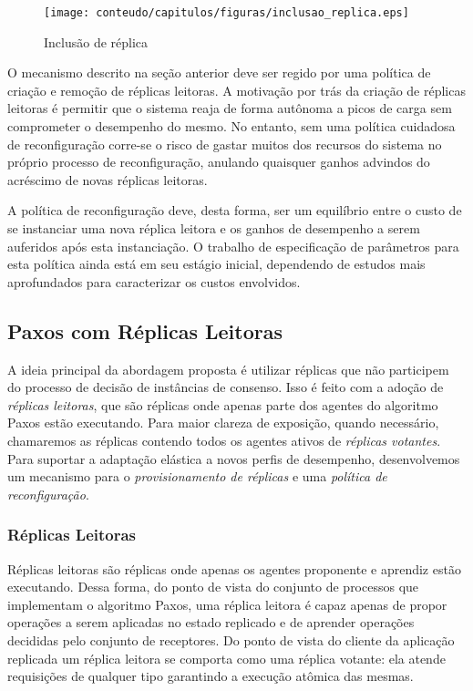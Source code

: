 \begin{figure}[ht]
  \centering
  \texttt{[image: conteudo/capitulos/figuras/inclusao\_replica.eps]}
  \caption{Inclusão de réplica}
  \label{fig:inclusao}
\end{figure}

O mecanismo descrito na seção anterior deve ser regido por uma política de criação e
remoção de réplicas leitoras. A  motivação por trás da criação de réplicas leitoras é
permitir que o sistema reaja de forma autônoma a picos de carga sem comprometer o
desempenho do mesmo. No entanto, sem uma política cuidadosa de reconfiguração corre-se o
risco de gastar muitos dos recursos do sistema no próprio processo de reconfiguração,
anulando quaisquer ganhos advindos do acréscimo de novas réplicas leitoras.

A política de reconfiguração deve, desta forma, ser um equilíbrio entre o custo de se
instanciar uma nova réplica leitora e os ganhos de desempenho a serem auferidos após esta
instanciação. O trabalho de especificação de parâmetros para esta política ainda está em
seu estágio inicial, dependendo de estudos mais aprofundados para caracterizar os custos
envolvidos.

\subsection{Paxos com Réplicas Leitoras}

A ideia principal da abordagem proposta é utilizar réplicas que não participem do processo
de decisão de instâncias de consenso. Isso é feito com a adoção de \emph{réplicas
leitoras}, que são réplicas onde apenas parte dos agentes do algoritmo Paxos estão
executando. Para maior clareza de exposição, quando necessário, chamaremos as réplicas
contendo todos os agentes ativos de \emph{réplicas votantes}. Para suportar a adaptação
elástica a novos perfis de desempenho, desenvolvemos um mecanismo para o
\emph{provisionamento de réplicas} e uma \emph{política de reconfiguração}.

\subsubsection{Réplicas Leitoras}

Réplicas leitoras são réplicas onde apenas os agentes proponente e aprendiz estão
executando. Dessa forma, do ponto de vista do conjunto de processos que implementam o
algoritmo Paxos, uma réplica leitora é capaz apenas de propor operações a serem aplicadas
no estado replicado e de aprender operações decididas pelo conjunto de receptores. Do
ponto de vista do cliente da aplicação replicada um réplica leitora se comporta como uma
réplica votante: ela atende requisições de qualquer tipo garantindo a execução atômica das
mesmas.

